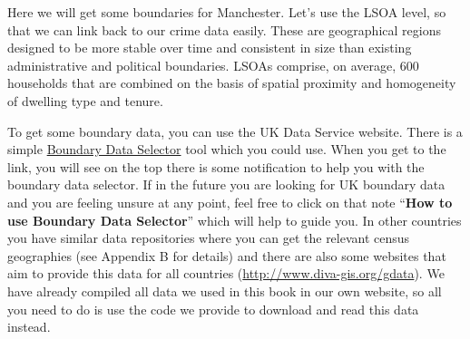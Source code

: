 \documentclass[
]{book}
\newenvironment{Shaded}{\begin{snugshade}}{\end{snugshade}}
\newcommand{\AttributeTok}[1]{\textcolor[rgb]{0.77,0.63,0.00}{#1}}
\newcommand{\CommentTok}[1]{\textcolor[rgb]{0.56,0.35,0.01}{\textit{#1}}}
\newcommand{\ConstantTok}[1]{\textcolor[rgb]{0.00,0.00,0.00}{#1}}
\newcommand{\DocumentationTok}[1]{\textcolor[rgb]{0.56,0.35,0.01}{\textbf{\textit{#1}}}}
\newcommand{\FunctionTok}[1]{\textcolor[rgb]{0.00,0.00,0.00}{#1}}
\newcommand{\NormalTok}[1]{#1}
\newcommand{\OtherTok}[1]{\textcolor[rgb]{0.56,0.35,0.01}{#1}}
\newcommand{\SpecialCharTok}[1]{\textcolor[rgb]{0.00,0.00,0.00}{#1}}
\newcommand{\StringTok}[1]{\textcolor[rgb]{0.31,0.60,0.02}{#1}}
\begin{document}
Here we will get some boundaries for Manchester. Let's use the LSOA level, so that we can link back to our crime data easily. These are geographical regions designed to be more stable over time and consistent in size than existing administrative and political boundaries. LSOAs comprise, on average, 600 households that are combined on the basis of spatial proximity and homogeneity of dwelling type and tenure.

To get some boundary data, you can use the UK Data Service website. There is a simple \href{https://borders.ukdataservice.ac.uk/bds.html}{Boundary Data Selector} tool which you could use. When you get to the link, you will see on the top there is some notification to help you with the boundary data selector. If in the future you are looking for UK boundary data and you are feeling unsure at any point, feel free to click on that note ``\textbf{How to use Boundary Data Selector}'' which will help to guide you. In other countries you have similar data repositories where you can get the relevant census geographies (see Appendix B for details) and there are also some websites that aim to provide this data for all countries (\url{http://www.diva-gis.org/gdata}). We have already compiled all data we used in this book in our own website, so all you need to do is use the code we provide to download and read this data instead.

\begin{Shaded}
\end{Shaded}
\end{document}
